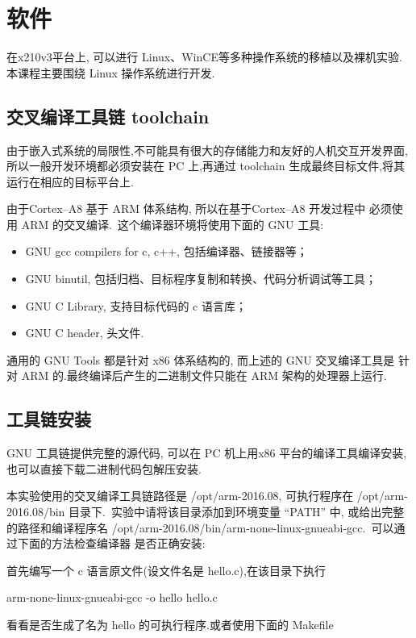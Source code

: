 \section{软件}

	在x210v3平台上, 可以进行 Linux、WinCE等多种操作系统的移植以及裸机实验.
本课程主要围绕 Linux 操作系统进行开发.

\subsection{交叉编译工具链 toolchain}
	由于嵌入式系统的局限性,不可能具有很大的存储能力和友好的人机交互开发界面,
所以一般开发环境都必须安装在 PC 上,再通过 toolchain 生成最终目标文件,将其
运行在相应的目标平台上.

	由于Cortex--A8 基于 ARM 体系结构, 所以在基于Cortex--A8 开发过程中
必须使用 ARM 的交叉编译.~这个编译器环境将使用下面的 GNU 工具:
\begin{itemize}\itemsep=-3pt
  \item GNU gcc compilers for c, c++, 包括编译器、链接器等；
  \item GNU binutil, 包括归档、目标程序复制和转换、代码分析调试等工具；
  \item GNU C Library, 支持目标代码的 c 语言库；
  \item GNU C header, 头文件.
\end{itemize}
	通用的 GNU Tools 都是针对 x86 体系结构的, 而上述的 GNU 交叉编译工具是
针对 ARM 的.最终编译后产生的二进制文件只能在 ARM 架构的处理器上运行.

\subsection{工具链安装}
	GNU 工具链提供完整的源代码, 可以在 PC 机上用x86 平台的编译工具编译安装,
也可以直接下载二进制代码包解压安装.

	本实验使用的交叉编译工具链路径是 /opt/arm-2016.08, 可执行程序在
 /opt/arm-2016.08/bin 目录下.~实验中请将该目录添加到环境变量 ``PATH''
中, 或给出完整的路径和编译程序名
/opt/arm-2016.08/bin/arm-none-linux-gnueabi-gcc.~可以通过下面的方法检查编译器
是否正确安装:

    首先编写一个 c 语言原文件(设文件名是 hello.c),在该目录下执行

    arm-none-linux-gnueabi-gcc -o hello hello.c

    看看是否生成了名为 hello 的可执行程序.或者使用下面的 Makefile

